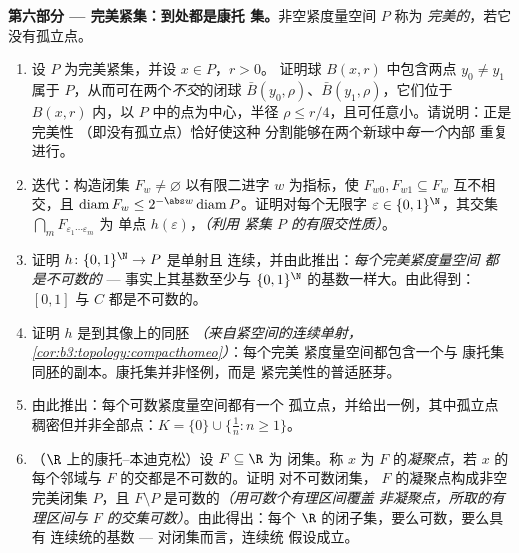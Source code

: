 \begin{problem}
\medskip
\noindent\textbf{第六部分 --- 完美紧集：到处都是康托
集。}非空紧度量空间 $P$ 称为
\emph{完美的}，若它没有孤立点。
\begin{enumerate}[resume]
  \item 设 $P$ 为完美紧集，并设 $x \in P$，$r > 0$。
        证明球 $B(x, r)$ 中包含两点 $y_0
        \neq y_1$ 属于 $P$，从而可在两个\emph{不交}的闭球
        $\bar B(y_0, \rho)$、$\bar B(y_1, \rho)$，它们位于
        $B(x, r)$ 内，以 $P$ 中的点为中心，半径 $\rho
        \leq r/4$，且可任意小。请说明：正是完美性
        （即没有孤立点）恰好使这种
        分割能够在两个新球中\emph{每一个}内部
        重复进行。
  \item 迭代：构造闭集 $F_w \neq \varnothing$
        以有限二进字 $w$ 为指标，使 $F_{w0},
        F_{w1} \subseteq F_w$ 互不相交，且
        $\operatorname{diam}F_w \leq 2^{-\abs w}
        \operatorname{diam}P$。证明对每个无限字
        $\varepsilon \in \{0,1\}^\N$，其交集
        $\bigcap_mF_{\varepsilon_1\cdots\varepsilon_m}$ 为
        单点 $h(\varepsilon)$，\emph{（利用
        紧集 $P$ 的有限交性质）}。
  \item 证明 $h\colon\{0,1\}^\N \to P$ 是单射且
        连续，并由此推出：\emph{每个完美紧度量空间
        都是不可数的} --- 事实上其基数至少与
        $\{0,1\}^\N$ 的基数一样大。由此得到：$[0,1]$ 与 $C$
        都是不可数的。
  \item 证明 $h$ 是到其像上的同胚
        \emph{（来自紧空间的连续单射，
        \cref{cor:b3:topology:compacthomeo}）}：每个完美
        紧度量空间都包含一个与
        康托集同胚的副本。康托集并非怪例，而是
        紧完美性的普适胚芽。
  \item 由此推出：每个可数紧度量空间都有一个
        孤立点，并给出一例，其中孤立点
        稠密但并非全部点：$K = \{0\} \cup
        \{\frac1n : n \geq 1\}$。
  \item （$\R$ 上的康托--本迪克松）设 $F \subseteq \R$ 为
        闭集。称 $x$ 为 $F$ 的\emph{凝聚点}，若
        $x$ 的每个邻域与 $F$ 的交都是不可数的。证明
        对不可数闭集，
        $F$ 的凝聚点构成非空完美闭集 $P$，且 $F
        \setminus P$ 是可数的\emph{（用可数个有理区间覆盖
        非凝聚点，所取的有理区间与
        $F$ 的交集可数）}。由此得出：每个
        $\R$ 的闭子集，要么可数，要么具有
        连续统的基数 --- 对闭集而言，连续统
        假设成立。
\end{enumerate}


\end{problem}
